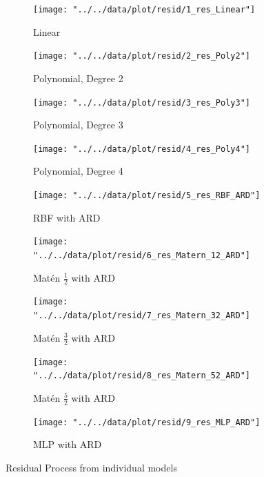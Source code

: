 \documentclass[11pt]{article}
\theoremstyle{definition}
\begin{document}
\begin{figure}[ht]
\centering
\begin{subfigure}{.33\textwidth}
  \centering
  \texttt{[image: "../../data/plot/resid/1\_res\_Linear"]}
  \caption{Linear}
  \label{fig:sfig11}
\end{subfigure}\hspace*{-0.1em}
\begin{subfigure}{.33\textwidth}
  \centering
  \texttt{[image: "../../data/plot/resid/2\_res\_Poly2"]}
  \caption{Polynomial, Degree 2}
  \label{fig:sfig12}
\end{subfigure}\hspace*{-0.1em}
\begin{subfigure}{.33\textwidth}
  \centering
  \texttt{[image: "../../data/plot/resid/3\_res\_Poly3"]}
  \caption{Polynomial, Degree 3}
  \label{fig:sfig13}
\end{subfigure}

\begin{subfigure}{.33\textwidth}
  \centering
  \texttt{[image: "../../data/plot/resid/4\_res\_Poly4"]}
  \caption{Polynomial, Degree 4}
  \label{fig:sfig21}
\end{subfigure}\hspace*{-0.1em}
\begin{subfigure}{.33\textwidth}
  \centering
  \texttt{[image: "../../data/plot/resid/5\_res\_RBF\_ARD"]}
  \caption{RBF with ARD}
  \label{fig:sfig22}
\end{subfigure}\hspace*{-0.1em}
\begin{subfigure}{.33\textwidth}
  \centering
  \texttt{[image: "../../data/plot/resid/6\_res\_Matern\_12\_ARD"]}
  \caption{Mat\'{e}n $\frac{1}{2}$ with ARD}
  \label{fig:sfig23}
\end{subfigure}

\begin{subfigure}{.33\textwidth}
  \centering
  \texttt{[image: "../../data/plot/resid/7\_res\_Matern\_32\_ARD"]}
  \caption{Mat\'{e}n $\frac{3}{2}$ with ARD}
  \label{fig:sfig21}
\end{subfigure}\hspace*{-0.1em}
\begin{subfigure}{.33\textwidth}
  \centering
  \texttt{[image: "../../data/plot/resid/8\_res\_Matern\_52\_ARD"]}
  \caption{Mat\'{e}n $\frac{5}{2}$ with ARD}
  \label{fig:sfig22}
\end{subfigure}\hspace*{-0.1em}
\begin{subfigure}{.33\textwidth}
  \centering
  \texttt{[image: "../../data/plot/resid/9\_res\_MLP\_ARD"]}
  \caption{MLP with ARD}
  \label{fig:sfig23}
\end{subfigure}

\caption{Residual Process from individual models}
\label{fig:res}
\end{figure}
\end{document}
